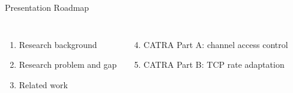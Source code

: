 \begin{frame}{Presentation Roadmap}
\begin{columns}[T,onlytextwidth]
\begin{enumerate}
    \item Research background
    \item Research problem and gap
    \item Related work
\end{enumerate}

\begin{enumerate}
    \setcounter{enumi}{3}
    \item CATRA Part A: channel access control
    \item CATRA Part B: TCP rate adaptation
\end{enumerate}
\end{columns}
\end{frame}
